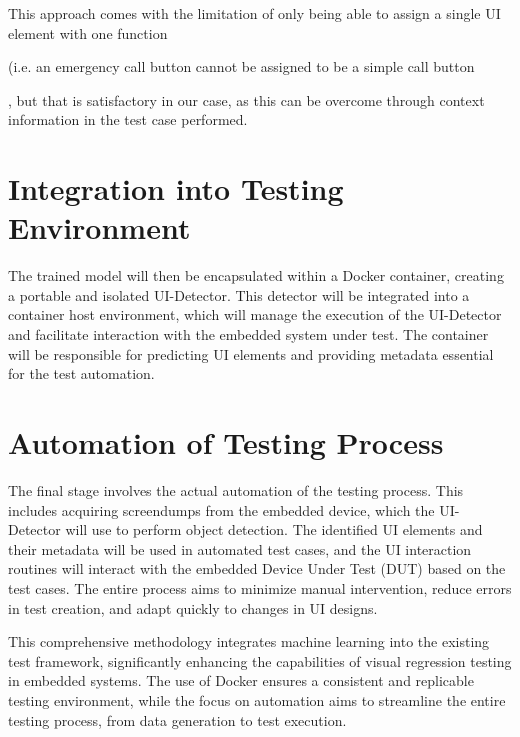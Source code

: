 \documentclass[Proposal,BIC,english,IEEE]{BASE/twbook} %
\begin{document}
This approach comes with the limitation of only being able to assign a single UI element with one function \begin{em}(i.e. an emergency call button cannot be assigned to be a simple call button\end{em}, but that is satisfactory in our case, as this can be overcome through context information in the test case performed.

\section{Integration into Testing Environment}
The trained model will then be encapsulated within a Docker container, creating a portable and isolated UI-Detector. This detector will be integrated into a container host environment, which will manage the execution of the UI-Detector and facilitate interaction with the embedded system under test. The container will be responsible for predicting UI elements and providing metadata essential for the test automation.

\section{Automation of Testing Process}
The final stage involves the actual automation of the testing process. This includes acquiring screendumps from the embedded device, which the UI-Detector will use to perform object detection. The identified UI elements and their metadata will be used in automated test cases, and the UI interaction routines will interact with the embedded Device Under Test (DUT) based on the test cases. The entire process aims to minimize manual intervention, reduce errors in test creation, and adapt quickly to changes in UI designs.

This comprehensive methodology integrates machine learning into the existing test framework, significantly enhancing the capabilities of visual regression testing in embedded systems. The use of Docker ensures a consistent and replicable testing environment, while the focus on automation aims to streamline the entire testing process, from data generation to test execution.

\clearpage                                                       %

\printbib                                             %
\clearpage
\end{document}
